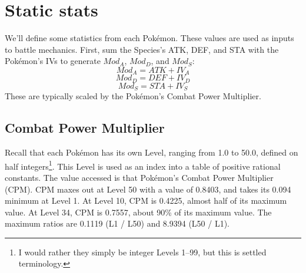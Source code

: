 \chapter{Static stats}

We'll define some statistics from each Pokémon.
These values are used as inputs to battle mechanics.
First, sum the Species's ATK, DEF, and STA with the Pokémon's
 IVs to generate $Mod_A$, $Mod_D$, and $Mod_S$:
 \[ Mod_A = ATK + IV_A \]
 \[ Mod_D = DEF + IV_D \]
 \[ Mod_S = STA + IV_S \]
These are typically scaled by the Pokémon's Combat Power Multiplier.
\section{Combat Power Multiplier}
Recall that each Pokémon has its own Level, ranging from 1.0
 to 50.0, defined on half integers\footnote{I would rather they
 simply be integer Levels 1--99, but this is settled terminology.}.
This Level is used as an index into a table of positive rational constants.
The value accessed is that Pokémon's Combat Power Multiplier (CPM).
CPM maxes out at Level 50 with a value of 0.8403, and takes its 
  0.094 minimum at Level 1.
At Level 10, CPM is 0.4225, almost half of its maximum value.
At Level 34, CPM is 0.7557, about 90\% of its maximum value.
The maximum ratios are 0.1119 (L1 / L50) and 8.9394 (L50 / L1).

